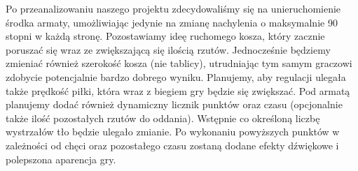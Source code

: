 \documentclass{article}
\begin{document}
\smallskip
\large Po przeanalizowaniu naszego projektu zdecydowaliśmy się na unieruchomienie środka armaty, umożliwiając jedynie na zmianę nachylenia o maksymalnie 90 stopni w każdą stronę. Pozostawiamy ideę ruchomego kosza, który zacznie poruszać się wraz ze zwiększającą się ilością rzutów. Jednocześnie będziemy zmieniać również szerokość kosza (nie tablicy), utrudniając tym samym graczowi zdobycie potencjalnie bardzo dobrego wyniku. Planujemy, aby regulacji ulegała także prędkość piłki, która wraz z biegiem gry będzie się zwiększać. Pod armatą planujemy dodać również dynamiczny licznik punktów oraz czasu (opcjonalnie także ilość pozostałych rzutów do oddania). Wstępnie co określoną liczbę wystrzałów tło będzie ulegało zmianie. Po wykonaniu powyższych punktów w zależności od chęci oraz pozostałego czasu zostaną dodane efekty dźwiękowe i polepszona aparencja gry.  \\
\end{document}
